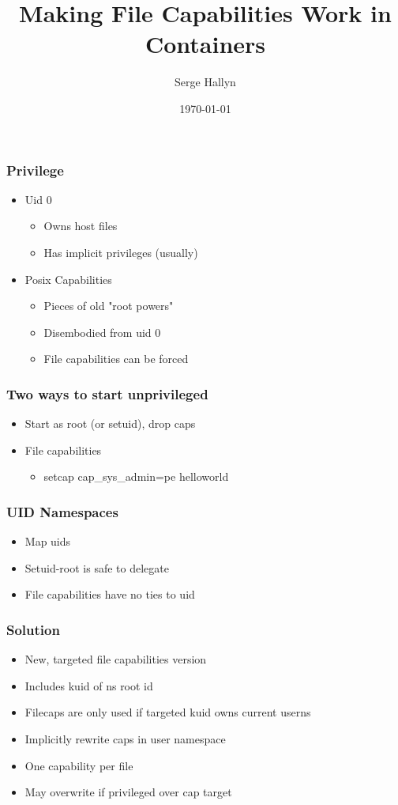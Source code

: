 \documentclass{beamer}
\title[Targeted File Capabilities]{Making File Capabilities Work in Containers} %
\author{Serge Hallyn} %
\institute{LXC project}
\date{\today} %
\begin{document}
\begin{frame}
\titlepage %
\end{frame}

\begin{frame}[fragile]
\frametitle{Privilege}
	\begin{itemize}
	\item Uid 0
		\begin{itemize}
		\item Owns host files
		\item Has implicit privileges (usually)
		\end{itemize}
\pause
	\item Posix Capabilities
		\begin{itemize}
		\item Pieces of old "root powers"
		\item Disembodied from uid 0
		\item File capabilities can be forced
		\end{itemize}
	\end{itemize}
\end{frame}

\begin{frame}[fragile]
\frametitle{Two ways to start unprivileged}
	\begin{itemize}
	\item Start as root (or setuid), drop caps
	\item File capabilities
		\begin{itemize}
		\item setcap cap\_sys\_admin=pe helloworld
		\end{itemize}
	\end{itemize}
\end{frame}

\begin{frame}
\frametitle{UID Namespaces}
	\begin{itemize}
	\item Map uids
	\item Setuid-root is safe to delegate
	\item File capabilities have no ties to uid
	\end{itemize}
\end{frame}

\begin{frame}
\frametitle{Solution}
	\begin{itemize}
	\item New, targeted file capabilities version
	\item Includes kuid of ns root id
	\item Filecaps are only used if targeted kuid owns current userns
	\item Implicitly rewrite caps in user namespace
	\item One capability per file
	\item May overwrite if privileged over cap target
	\end{itemize}
\end{frame}
\end{document}
